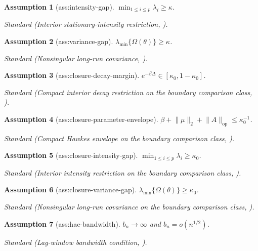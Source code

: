 \documentclass{article}
\newtheorem{assumption}{Assumption}
\begin{document}
\begin{assumption}[ass:intensity-gap]\label{ass:intensity-gap}
\(\min_{1\leq i\leq p}\lambda_i\geq\kappa\).
\par\smallskip\noindent\emph{Standard} (Interior stationary-intensity restriction, \cite{BacryMuzy2016}).
\end{assumption}

\begin{assumption}[ass:variance-gap]\label{ass:variance-gap}
\(\lambda_{\min}\{\Omega(\theta)\}\geq\kappa\).
\par\smallskip\noindent\emph{Standard} (Nonsingular long-run covariance, \cite{ZhangWu2017}).
\end{assumption}

\begin{assumption}[ass:closure-decay-margin]\label{ass:closure-decay-margin}
\(e^{-\beta\Delta}\in[\kappa_0,1-\kappa_0]\).
\par\smallskip\noindent\emph{Standard} (Compact interior decay restriction on the boundary comparison class, \cite{CheyssonLang2022}).
\end{assumption}

\begin{assumption}[ass:closure-parameter-envelope]\label{ass:closure-parameter-envelope}
\(\beta+\lVert\mu\rVert_2+\lVert A\rVert_{\mathrm{op}}\leq\kappa_0^{-1}\).
\par\smallskip\noindent\emph{Standard} (Compact Hawkes envelope on the boundary comparison class, \cite{CheyssonLang2022}).
\end{assumption}

\begin{assumption}[ass:closure-intensity-gap]\label{ass:closure-intensity-gap}
\(\min_{1\leq i\leq p}\lambda_i\geq\kappa_0\).
\par\smallskip\noindent\emph{Standard} (Interior intensity restriction on the boundary comparison class, \cite{BacryMuzy2016}).
\end{assumption}

\begin{assumption}[ass:closure-variance-gap]\label{ass:closure-variance-gap}
\(\lambda_{\min}\{\Omega(\theta)\}\geq\kappa_0\).
\par\smallskip\noindent\emph{Standard} (Nonsingular long-run covariance on the boundary comparison class, \cite{ZhangWu2017}).
\end{assumption}

\begin{assumption}[ass:hac-bandwidth]\label{ass:hac-bandwidth}
\(b_n\to\infty\) and \(b_n=o(n^{1/2})\).
\par\smallskip\noindent\emph{Standard} (Lag-window bandwidth condition, \cite{ZhangWu2017}).
\end{assumption}
\end{document}

